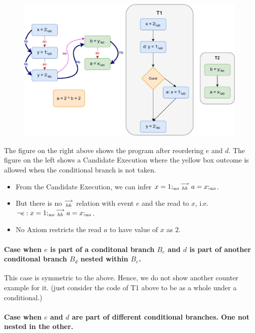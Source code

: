             \begin{figure}[H]
                \centering 
                \includegraphics[scale=0.7]{5.InstructionReordering/5.ValidReorderingProgram/CounterExamples2b(Conditionals).pdf}
                \caption{}
            \end{figure}
            The figure on the right above shows the program after reordering $e$ and $d$.  
            The figure on the left shows a Candidate Execution where the yellow box outcome is allowed when the conditional branch is not taken.
            \begin{itemize}
                \item From the Candidate Execution, we can infer $x=1;_{uo}\stackrel{\longrightarrow}{_{hb}}a=x;_{uo}$. 
                \item But there is no $\stackrel{\longrightarrow}{_{hb}}$ relation with event $e$ and the read to $x$, i.e. $\neg e:x=1;_{uo}\stackrel{\longrightarrow}{_{hb}}a=x;_{uo}$.
                \item No Axiom restricts the read $a$ to have value of $x$ as $2$.
            \end{itemize}


        \paragraph{Case when $e$ is part of a conditonal branch $B_e$ and $d$ is part of another conditonal branch $B_d$ nested within $B_e$.}

            This case is symmetric to the above. Hence, we do not show another counter example for it. (just consider the code of T1 above to be as a whole under a conditional.)

        \paragraph{Case when $e$ and $d$ are part of different conditional branches. One not nested in the other.}

